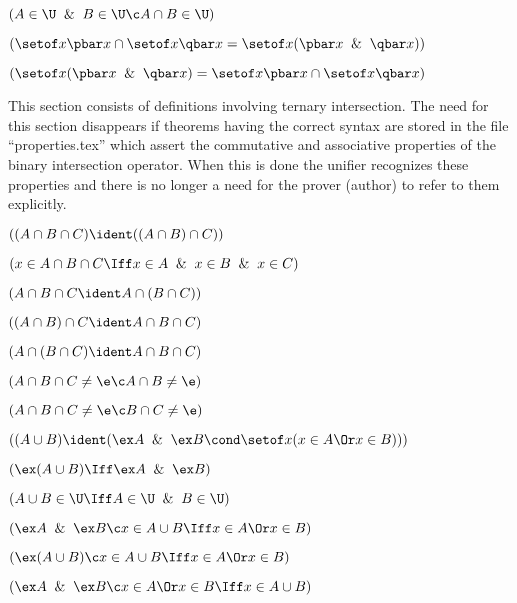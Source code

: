  $(A \in \U \And B \in \U \c A \cap B \in \U)$

 $(\setof x \pbar x \cap \setof x \qbar x = \setof x (\pbar x\And\qbar x))$

 $( \setof x (\pbar x\And\qbar x) = \setof x \pbar x \cap \setof x \qbar x)$
\lineb

This section consists of definitions involving ternary intersection.  The
need for this section disappears if theorems having the correct syntax
are stored in the file ``properties.tex'' which assert the commutative
and associative properties of the binary intersection operator.  When
this is done the unifier recognizes these properties and there is no longer
a need for the prover (author) to refer to them explicitly.
\lineb


 $((A\cap B \cap C )\ident ((A \cap B) \cap C))$


 $(x \in A \cap B \cap C \Iff x \in A \And x \in B\And x \in C)$

 $(A\cap B \cap C \ident A \cap (B \cap C))$

 $((A\cap B) \cap C \ident A \cap B \cap C)$

 $(A\cap (B \cap C) \ident A \cap B \cap C)$

 $(A \cap B \cap C \ne \e \c A \cap B \ne \e)$

 $(A \cap B \cap C \ne \e \c B \cap C \ne \e)$
\lineb





 $((A \cup B) \ident (\ex A \And \ex B \cond \setof x(x \in A \Or x \in B)))$


 $(\ex (A \cup B) \Iff \ex A \And \ex B)$

 $(A \cup B \in \U \Iff A \in \U \And B \in \U)$

 $(\ex A \And \ex B \c x \in A \cup B \Iff x \in A \Or x \in B)$

 $(\ex (A\cup B) \c x \in A \cup B \Iff x \in A \Or x \in B)$

 $(\ex A \And \ex B \c x \in A \Or x \in B \Iff x \in A \cup B )$

